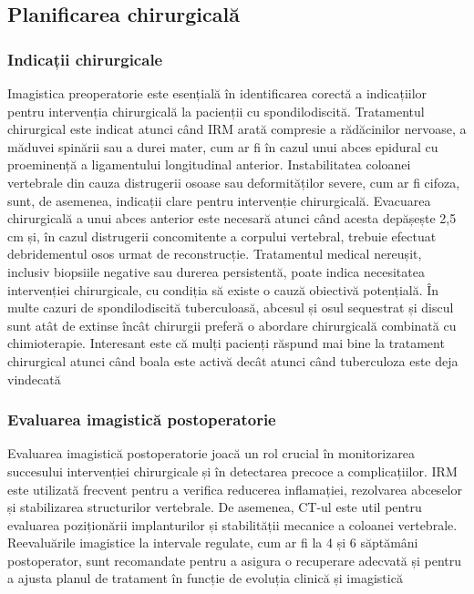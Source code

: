\documentclass[romanian,12pt,a4paper]{article}
\begin{document}
\subsection{Planificarea chirurgicală}

\subsubsection{Indicații chirurgicale}

Imagistica preoperatorie este esențială în identificarea corectă a
indicațiilor pentru intervenția chirurgicală la pacienții cu
spondilodiscită. Tratamentul chirurgical este indicat atunci când IRM
arată compresie a rădăcinilor nervoase, a măduvei spinării sau a durei
mater, cum ar fi în cazul unui abces epidural cu proeminență a
ligamentului longitudinal anterior. Instabilitatea coloanei vertebrale
din cauza distrugerii osoase sau deformităților severe, cum ar fi
cifoza, sunt, de asemenea, indicații clare pentru intervenție
chirurgicală. Evacuarea chirurgicală a unui abces anterior este necesară
atunci când acesta depășește 2,5 cm și, în cazul distrugerii
concomitente a corpului vertebral, trebuie efectuat debridementul osos
urmat de reconstrucție. Tratamentul medical nereușit, inclusiv biopsiile
negative sau durerea persistentă, poate indica necesitatea intervenției
chirurgicale, cu condiția să existe o cauză obiectivă potențială. În
multe cazuri de spondilodiscită tuberculoasă, abcesul și osul sequestrat
și discul sunt atât de extinse încât chirurgii preferă o abordare
chirurgicală combinată cu chimioterapie. Interesant este că mulți
pacienți răspund mai bine la tratament chirurgical atunci când boala
este activă decât atunci când tuberculoza este deja vindecată
\cite{SurgicalTreatmentSpondylodiscitis2012}

\subsubsection{Evaluarea imagistică postoperatorie}

Evaluarea imagistică postoperatorie joacă un rol crucial în
monitorizarea succesului intervenției chirurgicale și în detectarea
precoce a complicațiilor. IRM este utilizată frecvent pentru a verifica
reducerea inflamației, rezolvarea abceselor și stabilizarea structurilor
vertebrale. De asemenea, CT-ul este util pentru evaluarea poziționării
implanturilor și stabilității mecanice a coloanei vertebrale.
Reevaluările imagistice la intervale regulate, cum ar fi la 4 și 6
săptămâni postoperator, sunt recomandate pentru a asigura o recuperare
adecvată și pentru a ajusta planul de tratament în funcție de evoluția
clinică și imagistică \cite{RetrospectiveStudySpondylodiscitis2020}
\pagebreak
\end{document}
